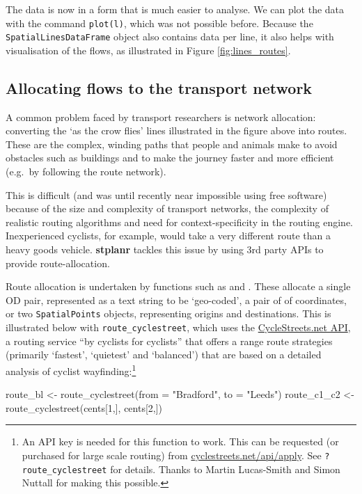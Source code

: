 The data is now in a form that is much easier to analyse. We can plot
the data with the command \texttt{plot(l)}, which was not possible
before. Because the \texttt{SpatialLinesDataFrame} object also contains
data per line, it also helps with visualisation of the flows, as
illustrated in Figure \ref{fig:lines_routes}.

\subsection{Allocating flows to the transport
network}\label{allocating-flows-to-the-transport-network}

A common problem faced by transport researchers is network allocation:
converting the `as the crow flies' lines illustrated in the figure above
into routes. These are the complex, winding paths that people and
animals make to avoid obstacles such as buildings and to make the
journey faster and more efficient (e.g.~by following the route network).

This is difficult (and was until recently near impossible using free
software) because of the size and complexity of transport networks, the
complexity of realistic routing algorithms and need for
context-specificity in the routing engine. Inexperienced cyclists, for
example, would take a very different route than a heavy goods vehicle.
\textbf{stplanr} tackles this issue by using 3rd party APIs to provide
route-allocation.

Route allocation is undertaken by  functions such as
 and \linebreak {}.
These allocate a single OD pair, represented as a text string to be
`geo-coded', a pair of of coordinates, or two \texttt{SpatialPoints}
objects, representing origins and destinations. This is illustrated
below with \texttt{route\_cyclestreet}, which uses the
\href{http://www.cyclestreets.net/api/}{CycleStreets.net API}, a routing
service ``by cyclists for cyclists'' that offers a range route
strategies (primarily `fastest', `quietest' and `balanced') that are
based on a detailed analysis of cyclist wayfinding:\footnote{An API key
  is needed for this function to work. This can be requested (or
  purchased for large scale routing) from
  \href{https://www.cyclestreets.net/api/apply/}{cyclestreets.net/api/apply}.
  See \texttt{?route\_cyclestreet} for details. Thanks to Martin
  Lucas-Smith and Simon Nuttall for making this possible.}

\begin{Schunk}
\begin{Sinput}
route_bl <- route_cyclestreet(from = "Bradford", to = "Leeds")
route_c1_c2 <- route_cyclestreet(cents[1,], cents[2,])
\end{Sinput}
\end{Schunk}

